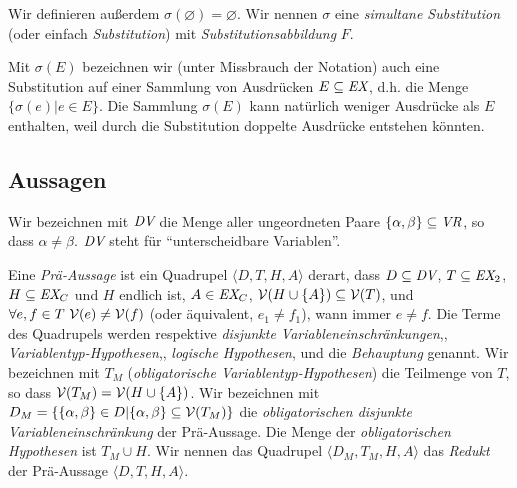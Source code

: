 Wir definieren außerdem $\sigma(\varnothing)=\varnothing$.  Wir nennen $\sigma$ eine {\em simultane Substitution} (oder einfach {\em Substitution}) mit {\em Substitutionsabbildung} $F$.

Mit $\sigma(E)$ bezeichnen wir (unter Missbrauch der Notation) auch eine Substitution auf einer Sammlung von Ausdrücken $E \subseteq \mbox{\em EX}$, d.h. die Menge $\{ \sigma(e) | e \in E \}$.  Die Sammlung $\sigma(E)$ kann natürlich weniger Ausdrücke als $E$ enthalten, weil durch die Substitution doppelte Ausdrücke entstehen könnten.


\subsection{Aussagen}

Wir bezeichnen mit $\mbox{\em DV}$ die Menge aller ungeordneten Paare $\{\alpha, \beta \} \subseteq \mbox{\em VR}$, so dass $\alpha \neq \beta$. $\mbox{\em DV}$ steht für "`unterscheidbare Variablen"'.

Eine {\em Prä-Aussage} ist ein Quadrupel $\langle D,T,H,A \rangle$ derart, dass $D\subseteq \mbox{\em DV}$, $T\subseteq \mbox{\em EX}_2$, $H\subseteq \mbox{\em EX}_C$ und $H$ endlich ist, $A\in \mbox{\em EX}_C$, ${\cal V}(H\cup\{A\}) \subseteq {\cal V}(T)$, und $\forall e,f\in T {\ } {\cal V}(e) \neq {\cal V}(f)$ (oder äquivalent, $e_1 \ne f_1$), wann immer $e \neq f$. Die Terme des Quadrupels werden respektive
{\em disjunkte Variableneinschränkungen},,
{\em Variablentyp-Hypothesen},,
{\em logische Hypothesen}, und die
{\em Behauptung} genannt.
Wir bezeichnen mit $T_M$ ({\em obligatorische Variablentyp-Hypothesen}) die Teilmenge von $T$, so dass ${\cal V}(T_M) ={\cal V}(H \cup \{A\})$.  Wir bezeichnen mit $D_M=\{\{\alpha,\beta\}\in D|\{\alpha,\beta\}\subseteq {\cal V}(T_M)\}$ die {\em obligatorischen disjunkte Variableneinschränkung} der Prä-Aussage. Die Menge der {\em obligatorischen Hypothesen} ist $T_M\cup H$.  Wir nennen das Quadrupel $\langle D_M,T_M,H,A \rangle$ das {\em Redukt} der Prä-Aussage $\langle D,T,H,A \rangle$.

